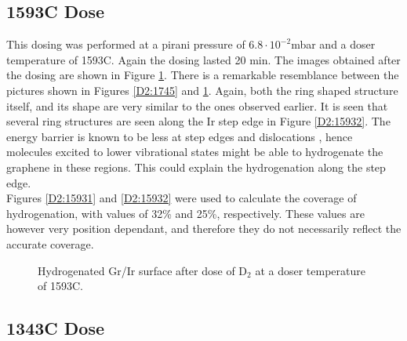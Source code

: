 \subsection{1593\degree C Dose}

This dosing was performed at a pirani pressure of $6.8 \cdot 10^{-2}$mbar and a doser temperature of 1593\degree C. Again the dosing lasted 20 min. The images obtained after the dosing are shown in Figure \ref{D2:1593}. There is a remarkable resemblance between the pictures shown in Figures \ref{D2:1745} and \ref{D2:1593}. Again, both the ring shaped structure itself, and its shape are very similar to the ones observed earlier. It is seen that several ring structures are seen along the Ir step edge in Figure \ref{D2:15932}. The energy barrier is known to be less at step edges and dislocations \cite{Lineunpublished}, hence molecules excited to lower vibrational states might be able to hydrogenate the graphene in these regions. This could explain the hydrogenation along the step edge.\\
Figures \ref{D2:15931} and \ref{D2:15932} were used to calculate the coverage of hydrogenation, with values of 32\% and 25\%, respectively. These values are however very position dependant, and therefore they do not necessarily reflect the accurate coverage.

\begin{figure}[H]
\caption{Hydrogenated Gr/Ir surface after dose of D$_2$ at a doser temperature of 1593\degree C.}
\label{D2:1593}
\end{figure}

\subsection{1343\degree C Dose}

